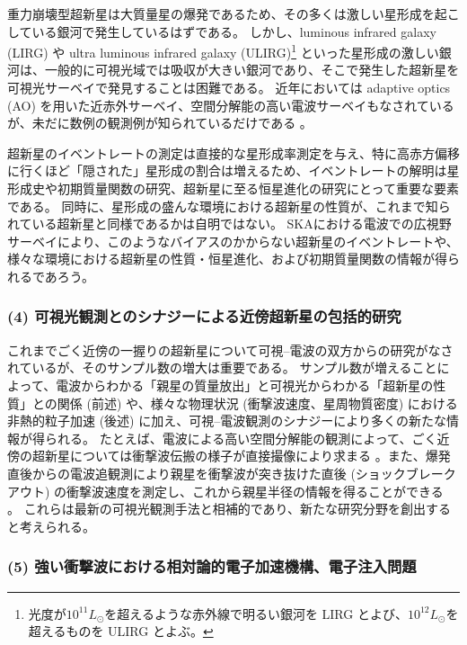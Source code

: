 重力崩壊型超新星は大質量星の爆発であるため、その多くは激しい星形成を起こしている銀河で発生しているはずである。
しかし、luminous infrared galaxy (LIRG) や ultra luminous infrared galaxy (ULIRG)\footnote{光度が$10^{11}L_\odot$を超えるような赤外線で明るい銀河を LIRG とよび、$10^{12}L_\odot$を超えるものを ULIRG とよぶ。} といった星形成の激しい銀河は、一般的に可視光域では吸収が大きい銀河であり、そこで発生した超新星を可視光サーベイで発見することは困難である。
近年においては adaptive optics (AO) を用いた近赤外サーベイ、空間分解能の高い電波サーベイもなされているが、未だに数例の観測例が知られているだけである \citep[e.g.,][]{2007ApJ...659L...9M}。

超新星のイベントレートの測定は直接的な星形成率測定を与え、特に高赤方偏移に行くほど「隠された」星形成の割合は増えるため、イベントレートの解明は星形成史や初期質量関数の研究、超新星に至る恒星進化の研究にとって重要な要素である。
同時に、星形成の盛んな環境における超新星の性質が、これまで知られている超新星と同様であるかは自明ではない。
SKAにおける電波での広視野サーベイにより、このようなバイアスのかからない超新星のイベントレートや、様々な環境における超新星の性質・恒星進化、および初期質量関数の情報が得られるであろう。

\subsubsection{(4) 可視光観測とのシナジーによる近傍超新星の包括的研究}

これまでごく近傍の一握りの超新星について可視--電波の双方からの研究がなされているが、そのサンプル数の増大は重要である。
サンプル数が増えることによって、電波からわかる「親星の質量放出」と可視光からわかる「超新星の性質」との関係 (前述) や、様々な物理状況 (衝撃波速度、星周物質密度) における非熱的粒子加速 (後述) に加え、可視--電波観測のシナジーにより多くの新たな情報が得られる。
たとえば、電波による高い空間分解能の観測によって、ごく近傍の超新星については衝撃波伝搬の様子が直接撮像により求まる \citep[e.g.,][]{1995Sci...270.1475M}。また、爆発直後からの電波追観測により親星を衝撃波が突き抜けた直後 (ショックブレークアウト) の衝撃波速度を測定し、これから親星半径の情報を得ることができる \citep{2013ApJ...762L..24M}。
これらは最新の可視光観測手法と相補的であり、新たな研究分野を創出すると考えられる。

\subsubsection{(5) 強い衝撃波における相対論的電子加速機構、電子注入問題}

